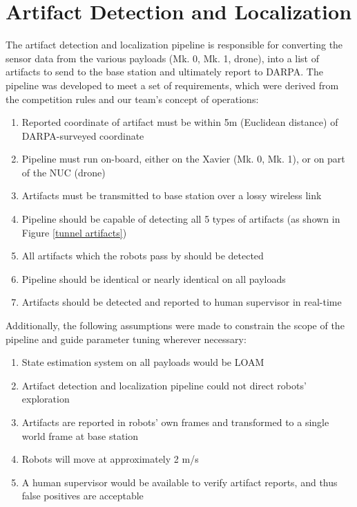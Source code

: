\chapter{Artifact Detection and Localization}

The artifact detection and localization pipeline is responsible for converting the sensor data from the various payloads (Mk. 0, Mk. 1, drone), into a list of artifacts to send to the base station and ultimately report to DARPA. The pipeline was developed to meet a set of requirements, which were derived from the competition rules and our team's concept of operations:

\begin{enumerate}
	\item Reported coordinate of artifact must be within 5m (Euclidean distance) of DARPA-surveyed coordinate
	\item Pipeline must run on-board, either on the Xavier (Mk. 0, Mk. 1), or on part of the NUC (drone)
	\item Artifacts must be transmitted to base station over a lossy wireless link
	\item Pipeline should be capable of detecting all 5 types of artifacts (as shown in Figure \ref{tunnel artifacts})
	\item All artifacts which the robots pass by should be detected
	\item Pipeline should be identical or nearly identical on all payloads
	\item Artifacts should be detected and reported to human supervisor in real-time
\end{enumerate}

Additionally, the following assumptions were made to constrain the scope of the pipeline and guide parameter tuning wherever necessary:

\begin{enumerate}
	\item State estimation system on all payloads would be LOAM
	\item Artifact detection and localization pipeline could not direct robots' exploration
	\item Artifacts are reported in robots' own frames and transformed to a single world frame at base station
	\item Robots will move at approximately 2 m/s
	\item A human supervisor would be available to verify artifact reports, and thus false positives are acceptable
\end{enumerate}

